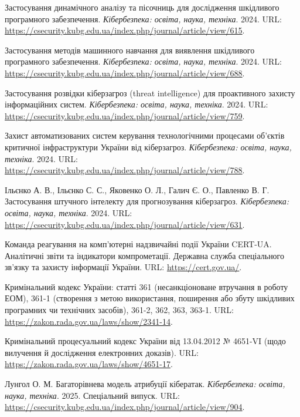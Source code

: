  Застосування динамічного аналізу та пісочниць для дослідження шкідливого програмного забезпечення. \emph{Кібербезпека: освіта, наука, техніка}. 2024. URL: \url{https://csecurity.kubg.edu.ua/index.php/journal/article/view/615}.

 Застосування методів машинного навчання для виявлення шкідливого програмного забезпечення. \emph{Кібербезпека: освіта, наука, техніка}. 2024. URL: \url{https://csecurity.kubg.edu.ua/index.php/journal/article/view/688}.

 Застосування розвідки кіберзагроз (threat intelligence) для проактивного захисту інформаційних систем. \emph{Кібербезпека: освіта, наука, техніка}. 2024. URL: \url{https://csecurity.kubg.edu.ua/index.php/journal/article/view/759}.

 Захист автоматизованих систем керування технологічними процесами об'єктів критичної інфраструктури України від кіберзагроз. \emph{Кібербезпека: освіта, наука, техніка}. 2024. URL: \url{https://csecurity.kubg.edu.ua/index.php/journal/article/view/788}.

 Ільєнко А. В., Ільєнко С. С., Яковенко О. Л., Галич Є. О., Павленко В. Г. Застосування штучного інтелекту для прогнозування кіберзагроз. \emph{Кібербезпека: освіта, наука, техніка}. 2024. URL: \url{https://csecurity.kubg.edu.ua/index.php/journal/article/view/631}.

 Команда реагування на комп'ютерні надзвичайні події України CERT-UA. Аналітичні звіти та індикатори компрометації. Державна служба спеціального зв'язку та захисту інформації України. URL: \url{https://cert.gov.ua/}.

 Кримінальний кодекс України: статті 361 (несанкціоноване втручання в роботу ЕОМ), 361-1 (створення з метою використання, поширення або збуту шкідливих програмних чи технічних засобів), 361-2, 362, 363, 363-1. URL: \url{https://zakon.rada.gov.ua/laws/show/2341-14}.

 Кримінальний процесуальний кодекс України від 13.04.2012 № 4651-VI (щодо вилучення й дослідження електронних доказів). URL: \url{https://zakon.rada.gov.ua/laws/show/4651-17}.

 Лунгол О. М. Багаторівнева модель атрибуції кібератак. \emph{Кібербезпека: освіта, наука, техніка}. 2025. Спеціальний випуск. URL: \url{https://csecurity.kubg.edu.ua/index.php/journal/article/view/904}.

